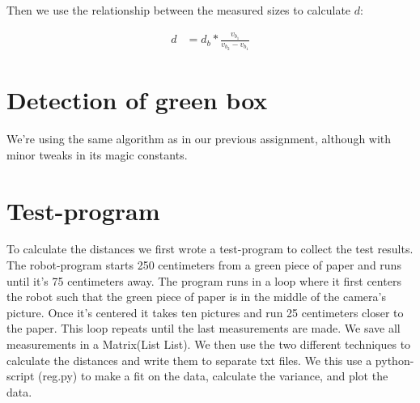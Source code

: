 \documentclass[a4paper,12pt]{article}
\begin{document}
Then we use the relationship between the measured sizes to calculate $d$:

\begin{align*}
  d &= d_b * \frac{v_{b_1}}{v_{b_2} - v_{b_1}}
\end{align*}


\section{Detection of green box}

We're using the same algorithm as in our previous assignment, although with minor
tweaks in its magic constants.
\section{Test-program}
To calculate the distances we first wrote a test-program to collect the test results. The robot-program starts 250 centimeters from a green piece of paper and runs until it's 75 centimeters away. The program runs in a loop where it first centers the robot such that the green piece of paper is in the middle of the camera's picture. Once it's centered it takes ten pictures and run 25 centimeters closer to the paper. This loop repeats until the last measurements are made. 
We save all measurements in a Matrix(List List). We then use the two different techniques to calculate the distances and write them to separate txt files.
We this use a python-script (reg.py) to make a fit on the data, calculate the variance, and plot the data.
\end{document}

